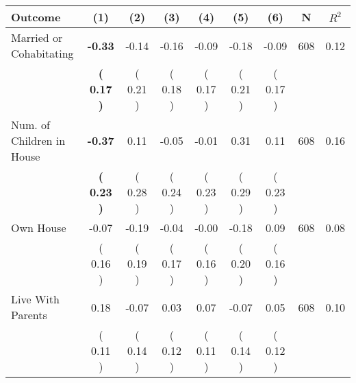 \begin{tabular}{lcccccccc}
\toprule
 \textbf{Outcome} & \textbf{(1)} & \textbf{(2)} & \textbf{(3)} & \textbf{(4)} & \textbf{(5)} & \textbf{(6)} & \textbf{N} & \textbf{$ R^2$} \\
\midrule
Married or Cohabitating & \textbf{    -0.33} &     -0.14 &     -0.16 &     -0.09 &     -0.18 &     -0.09 & 608 &       0.12 \\ 
 & \textbf{(     0.17 )} & (     0.21 ) & (     0.18 ) & (     0.17 ) & (     0.21 ) & (     0.17 ) & \\
Num. of Children in House & \textbf{    -0.37} &      0.11 &     -0.05 &     -0.01 &      0.31 &      0.11 & 608 &       0.16 \\ 
 & \textbf{(     0.23 )} & (     0.28 ) & (     0.24 ) & (     0.23 ) & (     0.29 ) & (     0.23 ) & \\
Own House &     -0.07 &     -0.19 &     -0.04 &     -0.00 &     -0.18 &      0.09 & 608 &       0.08 \\ 
 & (     0.16 ) & (     0.19 ) & (     0.17 ) & (     0.16 ) & (     0.20 ) & (     0.16 ) & \\
Live With Parents &      0.18 &     -0.07 &      0.03 &      0.07 &     -0.07 &      0.05 & 608 &       0.10 \\ 
 & (     0.11 ) & (     0.14 ) & (     0.12 ) & (     0.11 ) & (     0.14 ) & (     0.12 ) & \\
\bottomrule
\end{tabular}
